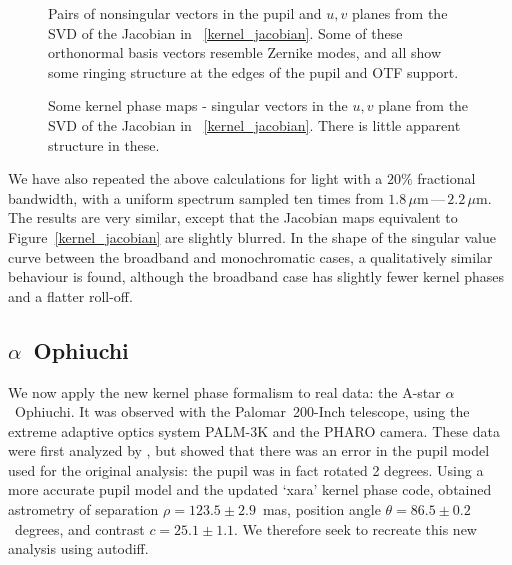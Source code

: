 \documentclass[modern]{aastex63}
\begin{document}
\begin{figure}
\caption{Pairs of nonsingular vectors in the pupil and $u,v$ planes from the SVD of the Jacobian in ~\ref{kernel_jacobian}. Some of these orthonormal basis vectors resemble Zernike modes, and all show some ringing structure at the edges of the pupil and OTF support.\href{https://github.com/benjaminpope/morphine/blob/stable/notebooks/morphine_uv.ipynb}{\color{linkcolor}\faGithub}
\label{nonsingular_modes}}
\end{figure}

\begin{figure}
\caption{Some kernel phase maps - singular vectors in the $u,v$ plane from the SVD of the Jacobian in ~\ref{kernel_jacobian}. There is little apparent structure in these.\href{https://github.com/benjaminpope/morphine/blob/stable/notebooks/morphine_uv.ipynb}{\color{linkcolor}\faGithub}
\label{kernel_modes}}
\end{figure}

We have also repeated the above calculations for light with a $20\%$ fractional bandwidth, with a uniform spectrum sampled ten times from $1.8\,\mu\text{m}$\,---\,$2.2\,\mu\text{m}$. The results are very similar, except that the Jacobian maps equivalent to Figure~\ref{kernel_jacobian} are slightly blurred. In the shape of the singular value curve between the broadband and monochromatic cases, a qualitatively similar behaviour is found, although the broadband case has slightly fewer kernel phases and a flatter roll-off.

\subsection{$\alpha$~Ophiuchi}
\label{sec:palomar}

We now apply the new kernel phase formalism to real data: the A-star $\alpha$~Ophiuchi. It was observed with the Palomar~200-Inch telescope, using the extreme adaptive optics system PALM-3K and the PHARO camera. These data were first analyzed by \citet{palomar}, but \citet{martinache20} showed that there was an error in the pupil model used for the original analysis: the pupil was in fact rotated 2 degrees. Using a more accurate pupil model and the updated `xara' kernel phase code, \citet{martinache20} obtained astrometry of separation $\rho = 123.5 \pm 2.9$~mas, position angle $\theta = 86.5 \pm 0.2$~degrees, and contrast $c = 25.1 \pm 1.1$. We therefore seek to recreate this new analysis using autodiff.
\end{document}
